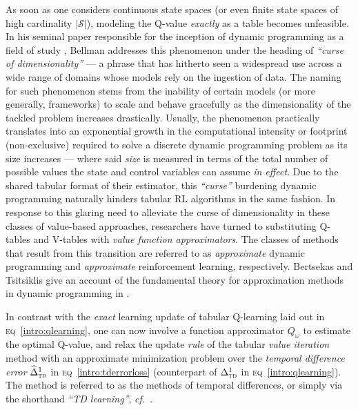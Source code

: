 As soon as one considers continuous state spaces (or even finite state spaces of high cardinality $|\mathcal{S}|$),
modeling the Q-value \emph{exactly} as a table becomes unfeasible.
In his seminal paper responsible for the inception of dynamic programming as a field of study \cite{Bellman1957-om},
Bellman addresses this phenomenon under the heading of \textit{``curse of dimensionality''} ---
a phrase that has hitherto seen a widespread use across a wide range of domains
whose models rely on the ingestion of data.
The naming for such phenomenon stems from the inability of certain models (or more generally, frameworks)
to scale and behave gracefully as the dimensionality of the tackled problem increases drastically.
Usually, the phenomenon practically translates into an exponential growth
in the computational intensity or footprint (non-exclusive) required to solve a discrete dynamic programming problem
as its size increases --- where said \textit{size} is measured in terms of the total number of possible values
the state and control variables can assume \emph{in effect}.
Due to the shared tabular format of their estimator, this \textit{``curse''} burdening dynamic programming
naturally hinders tabular RL algorithms in the same fashion.
In response to this glaring need to alleviate the curse of dimensionality in these classes of value-based
approaches, researchers have turned to substituting Q-tables and V-tables
with \emph{value function approximators}.
The classes of methods that result from this transition are referred to as \emph{approximate}
dynamic programming and \emph{approximate} reinforcement learning, respectively.
Bertsekas and Tsitsiklis give an account of the fundamental theory for approximation methods in dynamic programming
in \cite{Bertsekas1996-vt}.

In contrast with the \emph{exact} learning update of tabular Q-learning laid out in \textsc{eq}~\ref{intro:qlearning},
one can now involve a function approximator $Q_\omega$ to estimate the optimal Q-value,
and relax the update \emph{rule} of the tabular \emph{value iteration} method with
an approximate minimization problem over the \emph{temporal difference error} $\widehat{\Delta}_\textsc{td}^1$
in \textsc{eq}~\ref{intro:tderrorloss}
(counterpart of $\Delta_\textsc{td}^1$ in \textsc{eq}~\ref{intro:qlearning}).
The method is referred to as the methods of temporal differences, or
simply via the shorthand \emph{``TD learning''}, \textit{cf.}~\cite{Sutton1988-to,Sutton1999-ii}.

